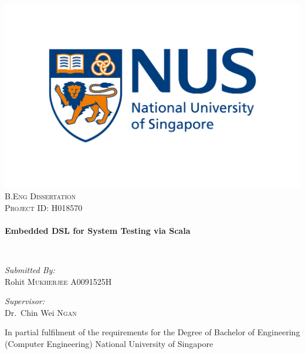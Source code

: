 \begin{titlepage}
\begin{center}

\includegraphics[width=1\textwidth]{figures/nus_logo.jpg}\\[1cm]

\textsc{\Large B.Eng Dissertation}\\[0.3cm]
\textsc{\Large Project ID: H018570}\\[0.3cm]

\HRule \\[0.4cm]
{ \huge \bfseries Embedded DSL for System Testing via Scala \\[0.4cm] }

\HRule \\[1.0cm]

\noindent
\begin{minipage}{0.4\textwidth}
\begin{flushleft} \large
\emph{Submitted By:}\\
Rohit \textsc{Mukherjee}
A0091525H
\end{flushleft}
\end{minipage}%
\begin{minipage}{0.4\textwidth}
\begin{flushright} \large
\emph{Supervisor:} \\
Dr.~Chin Wei \textsc{Ngan}
\end{flushright}
\end{minipage}
\vfill

\vspace{8 mm}
In partial fulfilment of the requirements for the Degree of Bachelor of Engineering (Computer Engineering) National University of Singapore 
\bigskip

\end{center}
\end{titlepage}